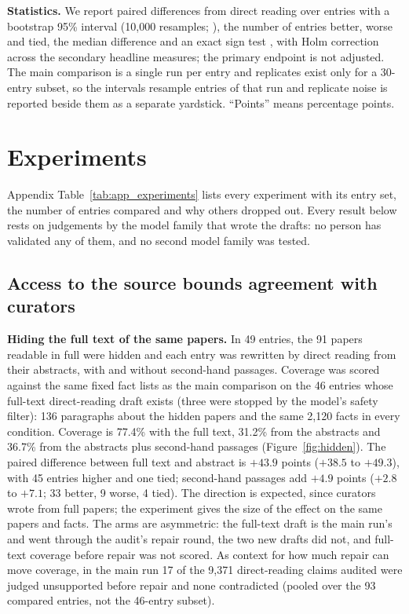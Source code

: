 \documentclass{article} %
\begin{document}
\textbf{Statistics.} We report paired differences from direct reading over entries with a bootstrap 95\% interval (10,000 resamples; \citealp{Efron1979BootstrapMethods}), the number of entries better, worse and tied, the median difference and an exact sign test \citep{Dixon1946StatisticalSign}, with Holm correction \citep{holm1979simple} across the secondary headline measures; the primary endpoint is not adjusted. The main comparison is a single run per entry and replicates exist only for a 30-entry subset, so the intervals resample entries of that run and replicate noise is reported beside them as a separate yardstick. ``Points'' means percentage points.

\section{Experiments}
\label{sec:experiments}
Appendix Table~\ref{tab:app_experiments} lists every experiment with its entry set, the number of entries compared and why others dropped out. Every result below rests on judgements by the model family that wrote the drafts: no person has validated any of them, and no second model family was tested.

\subsection{Access to the source bounds agreement with curators}
\label{sec:access}
\textbf{Hiding the full text of the same papers.} In 49 entries, the 91 papers readable in full were hidden and each entry was rewritten by direct reading from their abstracts, with and without second-hand passages. Coverage was scored against the same fixed fact lists as the main comparison on the 46 entries whose full-text direct-reading draft exists (three were stopped by the model's safety filter): 136 paragraphs about the hidden papers and the same 2,120 facts in every condition. Coverage is 77.4\% with the full text, 31.2\% from the abstracts and 36.7\% from the abstracts plus second-hand passages (Figure~\ref{fig:hidden}). The paired difference between full text and abstract is $+43.9$ points ($+38.5$ to $+49.3$), with 45 entries higher and one tied; second-hand passages add $+4.9$ points ($+2.8$ to $+7.1$; 33 better, 9 worse, 4 tied). The direction is expected, since curators wrote from full papers; the experiment gives the size of the effect on the same papers and facts. The arms are asymmetric: the full-text draft is the main run's and went through the audit's repair round, the two new drafts did not, and full-text coverage before repair was not scored. As context for how much repair can move coverage, in the main run 17 of the 9,371 direct-reading claims audited were judged unsupported before repair and none contradicted (pooled over the 93 compared entries, not the 46-entry subset).
\end{document}
